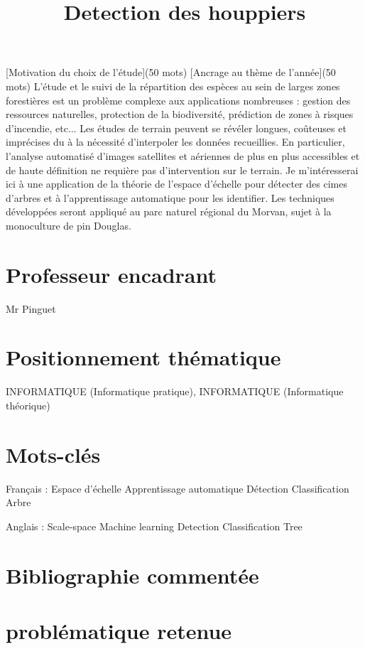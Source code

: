 \documentclass{article}
\title{Detection des houppiers}
\begin{document}
\maketitle

[Motivation du choix de l'étude](50 mots)
[Ancrage au thème de l'année](50 mots) 
L'étude et le suivi de la répartition des espèces au sein de larges zones forestières est un problème complexe aux applications nombreuses :
gestion des ressources naturelles, protection de la biodiversité, prédiction de zones à risques d'incendie, etc... Les études de terrain peuvent se révéler longues, coûteuses et imprécises du à la nécessité d'interpoler les données recueillies. 
En particulier, l'analyse automatisé d'images satellites et aériennes de plus en plus accessibles et de haute définition ne requière pas d'intervention sur le terrain. 
Je m'intéresserai ici à une application de la théorie de l'espace d'échelle pour détecter des cimes d'arbres et à l'apprentissage automatique pour les identifier.
Les techniques développées seront appliqué au parc naturel régional du Morvan, sujet à la monoculture de pin Douglas.

\section{Professeur encadrant}
Mr Pinguet

\section{Positionnement thématique}
INFORMATIQUE (Informatique pratique), INFORMATIQUE (Informatique théorique)

\section{Mots-clés}
Français :
Espace d'échelle
Apprentissage automatique 
Détection
Classification 
Arbre

Anglais :
Scale-space
Machine learning
Detection
Classification
Tree

\section{Bibliographie commentée}

\section{problématique retenue}
\end{document}
